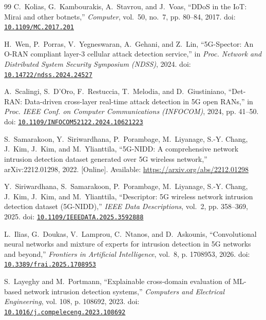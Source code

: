 \begin{thebibliography}{99}
C.~Kolias, G.~Kambourakis, A.~Stavrou, and J.~Voas, ``{DDoS} in the {IoT}:
  {Mirai} and other botnets,'' \emph{Computer}, vol.~50, no.~7, pp. 80--84,
  2017. doi:
  \href{https://doi.org/10.1109/MC.2017.201}{\nolinkurl{10.1109/MC.2017.201}}

H.~Wen, P.~Porras, V.~Yegneswaran, A.~Gehani, and Z.~Lin, ``{5G-Spector}: An
  {O-RAN} compliant layer-3 cellular attack detection service,'' in \emph{Proc.
  Network and Distributed System Security Symposium (NDSS)}, 2024. doi:
  \href{https://doi.org/10.14722/ndss.2024.24527}{\nolinkurl{10.14722/ndss.2024.24527}}

A.~Scalingi, S.~D'Oro, F.~Restuccia, T.~Melodia, and D.~Giustiniano,
  ``{Det-RAN}: Data-driven cross-layer real-time attack detection in {5G} open
  {RANs},'' in \emph{Proc. IEEE Conf. on Computer Communications (INFOCOM)},
  2024, pp. 41--50. doi:
  \href{https://doi.org/10.1109/INFOCOM52122.2024.10621223}{\nolinkurl{10.1109/INFOCOM52122.2024.10621223}}

\BIBentryALTinterwordspacing
S.~Samarakoon, Y.~Siriwardhana, P.~Porambage, M.~Liyanage, S.-Y. Chang, J.~Kim,
  J.~Kim, and M.~Ylianttila, ``{5G-NIDD}: A comprehensive network intrusion
  detection dataset generated over {5G} wireless network,'' arXiv:2212.01298,
  2022. [Online]. Available: \url{https://arxiv.org/abs/2212.01298}
\BIBentrySTDinterwordspacing

Y.~Siriwardhana, S.~Samarakoon, P.~Porambage, M.~Liyanage, S.-Y. Chang, J.~Kim,
  J.~Kim, and M.~Ylianttila, ``Descriptor: {5G} wireless network intrusion
  detection dataset ({5G-NIDD}),'' \emph{IEEE Data Descriptions}, vol.~2, pp.
  358--369, 2025. doi:
  \href{https://doi.org/10.1109/IEEEDATA.2025.3592888}{\nolinkurl{10.1109/IEEEDATA.2025.3592888}}

L.~Ilias, G.~Doukas, V.~Lamprou, C.~Ntanos, and D.~Askounis, ``Convolutional
  neural networks and mixture of experts for intrusion detection in {5G}
  networks and beyond,'' \emph{Frontiers in Artificial Intelligence}, vol.~8,
  p. 1708953, 2026. doi:
  \href{https://doi.org/10.3389/frai.2025.1708953}{\nolinkurl{10.3389/frai.2025.1708953}}

S.~Layeghy and M.~Portmann, ``Explainable cross-domain evaluation of {ML}-based
  network intrusion detection systems,'' \emph{Computers and Electrical
  Engineering}, vol. 108, p. 108692, 2023. doi:
  \href{https://doi.org/10.1016/j.compeleceng.2023.108692}{\nolinkurl{10.1016/j.compeleceng.2023.108692}}


\end{thebibliography}
